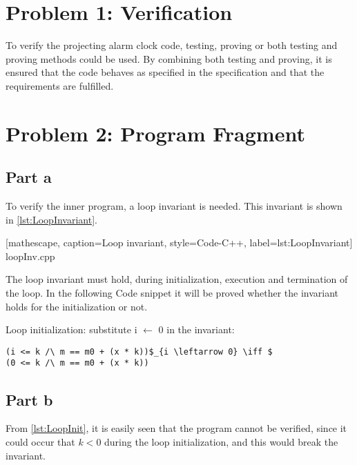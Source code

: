 \documentclass[Main_Assignment4]{subfiles}
\begin{document}
\section{Problem 1: Verification}
To verify the projecting alarm clock code, testing, proving or both testing and proving methods could be used. 
By combining both testing and proving, it is ensured that the code behaves as specified in the specification and that the requirements are fulfilled.

\section{Problem 2: Program Fragment} %
\label{sec:problem_2_program_fragment}


\subsection{Part a}
To verify the inner program, a loop invariant is needed. 
This invariant is shown in \codeTitle \ref{lst:LoopInvariant}. 


[mathescape, caption=Loop invariant, style=Code-C++, label=lst:LoopInvariant]
{loopInv.cpp}

The loop invariant must hold, during initialization, execution and termination of the loop. In the following Code snippet it will be proved whether the invariant holds for the initialization or not.



Loop initialization: substitute i $\leftarrow$ 0 in the invariant:
\begin{lstlisting}[mathescape, caption=Loop initialization, style=Code-C++, label=lst:LoopInit]
(i <= k /\ m == m0 + (x * k))$_{i \leftarrow 0} \iff $ 
(0 <= k /\ m == m0 + (x * k))  
\end{lstlisting}

\subsection{Part b}
From \codeTitle \ref{lst:LoopInit}, it is easily seen that the program cannot be verified, since it could occur that $k < 0$ during the loop initialization, and this would break the invariant.
\end{document}
